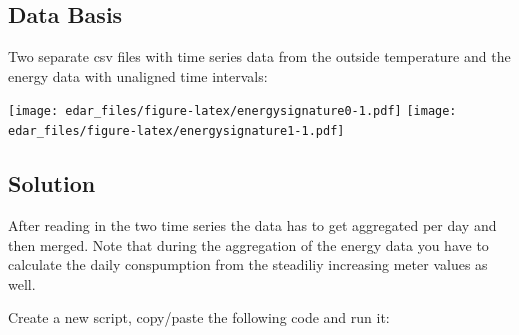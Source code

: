 \documentclass[
]{book}
\begin{document}
\hypertarget{data-basis-16}{%
\subsection{Data Basis}\label{data-basis-16}}

Two separate csv files with time series data from the outside temperature and the energy data with unaligned time intervals:

\texttt{[image: edar\_files/figure-latex/energysignature0-1.pdf]}
\texttt{[image: edar\_files/figure-latex/energysignature1-1.pdf]}

\hypertarget{solution-16}{%
\subsection{Solution}\label{solution-16}}

After reading in the two time series the data has to get aggregated per day and then merged. Note that during the aggregation of the energy data you have to calculate the daily conspumption from the steadiliy increasing meter values as well.

Create a new script, copy/paste the following code and run it:
\end{document}
